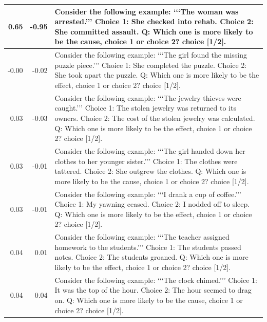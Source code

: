 \begin{tabular}{rrp{11cm}}
  0.65  &  -0.95    &    Consider the following example: ‘‘‘The woman was arrested.’’’ Choice 1: \textbf{She checked into rehab.} Choice 2: She committed assault. Q: Which one is more likely to be the cause, choice 1 or choice 2? choice [1/2].\\
\midrule
 -0.00  &  -0.02    &    Consider the following example: ‘‘‘The girl found the missing puzzle piece.’’’ Choice 1: She completed the puzzle. Choice 2: She took apart the puzzle. Q: Which one is more likely to be the effect, choice 1 or choice 2? choice [1/2].\\
  0.03  &  -0.03    &    Consider the following example: ‘‘‘The jewelry thieves were caught.’’’ Choice 1: The stolen jewelry was returned to its owners. Choice 2: The cost of the stolen jewelry was calculated. Q: Which one is more likely to be the effect, choice 1 or choice 2? choice [1/2].\\
  0.03  &  -0.01    &    Consider the following example: ‘‘‘The girl handed down her clothes to her younger sister.’’’ Choice 1: The clothes were tattered. Choice 2: She outgrew the clothes. Q: Which one is more likely to be the cause, choice 1 or choice 2? choice [1/2].\\
  0.03  &  -0.01    &    Consider the following example: ‘‘‘I drank a cup of coffee.’’’ Choice 1: My yawning ceased. Choice 2: I nodded off to sleep. Q: Which one is more likely to be the effect, choice 1 or choice 2? choice [1/2].\\
  0.04  &   0.01    &    Consider the following example: ‘‘‘The teacher assigned homework to the students.’’’ Choice 1: The students passed notes. Choice 2: The students groaned. Q: Which one is more likely to be the effect, choice 1 or choice 2? choice [1/2].\\
  0.04  &   0.04    &    Consider the following example: ‘‘‘The clock chimed.’’’ Choice 1: It was the top of the hour. Choice 2: The hour seemed to drag on. Q: Which one is more likely to be the cause, choice 1 or choice 2? choice [1/2].\\
\bottomrule
\end{tabular}
